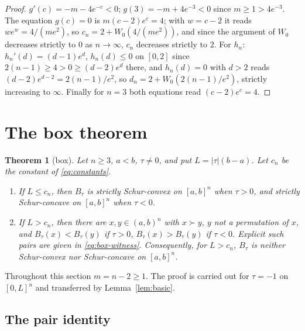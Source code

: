 \documentclass[11pt,a4paper]{article}
\theoremstyle{plain}
\newtheorem{theorem}{Theorem}[section]
\theoremstyle{definition}
\newcommand{\Wl}{W_{0}}
\newcommand{\maj}{\succ}
\begin{document}
\begin{proof}
$g'(c)=-m-4e^{-c}<0$; $g(3)=-m+4e^{-3}<0$ since $m\ge 1>4e^{-3}$. The equation $g(c)=0$ is $m(c-2)e^{c}=4$; with $w=c-2$ it reads $we^{w}=4/(me^2)$, so $c_n=2+\Wl(4/(me^2))$, and since the argument of $\Wl$ decreases strictly to $0$ as $n\to\infty$, $c_n$ decreases strictly to $2$. For $h_n$: $h_n'(d)=(d-1)e^{d}$, $h_n(d)\le 0$ on $[0,2]$ since $2(n-1)\ge 4>0\ge (d-2)e^d$ there, and $h_n(d)=0$ with $d>2$ reads $(d-2)e^{d-2}=2(n-1)/e^2$, so $d_n=2+\Wl(2(n-1)/e^2)$, strictly increasing to $\infty$. Finally for $n=3$ both equations read $(c-2)e^{c}=4$.
\end{proof}

\section{The box theorem}\label{sec:box}

\begin{theorem}[box]\label{thm:box}
Let $n\ge 3$, $a<b$, $\tau\ne 0$, and put $L=|\tau|(b-a)$. Let $c_n$ be the constant of \eqref{eq:constants}.
\begin{enumerate}
\item[(i)] If $L\le c_n$, then $B_\tau$ is strictly Schur-convex on $[a,b]^n$ when $\tau>0$, and strictly Schur-concave on $[a,b]^n$ when $\tau<0$.
\item[(ii)] If $L>c_n$, then there are $x,y\in(a,b)^n$ with $x\maj y$, $y$ not a permutation of $x$, and $B_\tau(x)<B_\tau(y)$ if $\tau>0$, $B_\tau(x)>B_\tau(y)$ if $\tau<0$. Explicit such pairs are given in \eqref{eq:box-witness}. Consequently, for $L>c_n$, $B_\tau$ is neither Schur-convex nor Schur-concave on $[a,b]^n$.
\end{enumerate}
\end{theorem}

Throughout this section $m=n-2\ge 1$. The proof is carried out for $\tau=-1$ on $[0,L]^n$ and transferred by Lemma~\ref{lem:basic}.

\subsection{The pair identity}
\end{document}
